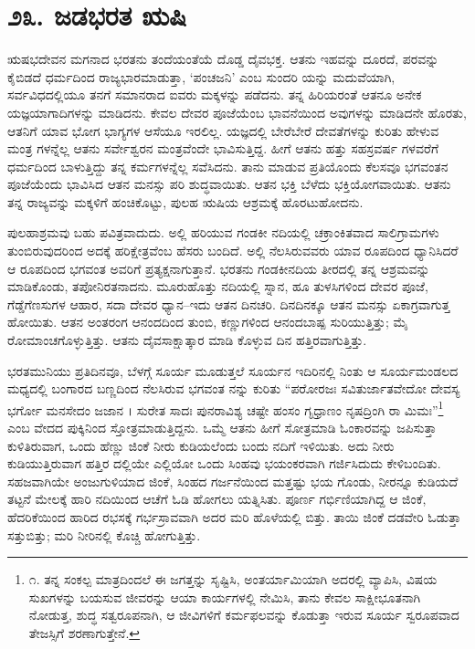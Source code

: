 
\chapter{೨೩. ಜಡಭರತ ಋಷಿ}

ಋಷಭದೇವನ ಮಗನಾದ ಭರತನು ತಂದೆಯಂತೆಯೆ ದೊಡ್ಡ ದೈವಭಕ್ತ. ಆತನು ಇಹವನ್ನು ದೂರದೆ, ಪರವನ್ನು ಕೈಬಿಡದೆ ಧರ್ಮದಿಂದ ರಾಜ್ಯಭಾರಮಾಡುತ್ತಾ, ‘ಪಂಚಜನಿ’ ಎಂಬ ಸುಂದರಿ ಯನ್ನು ಮದುವೆಯಾಗಿ, ಸರ್ವವಿಧದಲ್ಲಿಯೂ ತನಗೆ ಸಮಾನರಾದ ಐವರು ಮಕ್ಕಳನ್ನು ಪಡೆದನು. ತನ್ನ ಹಿರಿಯರಂತೆ ಆತನೂ ಅನೇಕ ಯಜ್ಞಯಾಗಾದಿಗಳನ್ನು ಮಾಡಿದನು. ಕೇವಲ ದೇವರ ಪೂಜೆಯೆಂಬ ಭಾವನೆಯಿಂದ ಅವುಗಳನ್ನು ಮಾಡಿದನೇ ಹೊರತು, ಆತನಿಗೆ ಯಾವ ಭೋಗ ಭಾಗ್ಯಗಳ ಆಸೆಯೂ ಇರಲಿಲ್ಲ. ಯಜ್ಞದಲ್ಲಿ ಬೇರೆಬೇರೆ ದೇವತೆಗಳನ್ನು ಕುರಿತು ಹೇಳುವ ಮಂತ್ರ ಗಳನ್ನೆಲ್ಲ ಆತನು ಸರ್ವೇಶ್ವರನ ಮಂತ್ರವೆಂದೇ ಭಾವಿಸುತ್ತಿದ್ದ. ಹೀಗೆ ಆತನು ಹತ್ತು ಸಹಸ್ರವರ್ಷ ಗಳವರೆಗೆ ಧರ್ಮದಿಂದ ಬಾಳುತ್ತಿದ್ದು ತನ್ನ ಕರ್ಮಗಳನ್ನೆಲ್ಲ ಸವೆಸಿದನು. ತಾನು ಮಾಡುವ ಪ್ರತಿಯೊಂದು ಕೆಲಸವೂ ಭಗವಂತನ ಪೂಜೆಯೆಂದು ಭಾವಿಸಿದ ಆತನ ಮನಸ್ಸು ಪರಿ ಶುದ್ಧವಾಯಿತು. ಆತನ ಭಕ್ತಿ ಬೆಳೆದು ಭಕ್ತಿಯೋಗವಾಯಿತು. ಆತನು ತನ್ನ ರಾಜ್ಯವನ್ನು ಮಕ್ಕಳಿಗೆ ಹಂಚಿಕೊಟ್ಟು, ಪುಲಹ ಋಷಿಯ ಆಶ್ರಮಕ್ಕೆ ಹೊರಟುಹೋದನು.

ಪುಲಹಾಶ್ರಮವು ಬಹು ಪವಿತ್ರವಾದುದು. ಅಲ್ಲಿ ಹರಿಯುವ ಗಂಡಕೀ ನದಿಯಲ್ಲಿ ಚಕ್ರಾಂಕಿತವಾದ ಸಾಲಿಗ್ರಾಮಗಳು ತುಂಬಿರುವುದರಿಂದ ಅದಕ್ಕೆ ಹರಿಕ್ಷೇತ್ರವೆಂಬ ಹೆಸರು ಬಂದಿದೆ. ಅಲ್ಲಿ ನೆಲಸಿರುವವರು ಯಾವ ರೂಪದಿಂದ ಧ್ಯಾನಿಸಿದರೆ ಆ ರೂಪದಿಂದ ಭಗವಂತ ಅವರಿಗೆ ಪ್ರತ್ಯಕ್ಷನಾಗುತ್ತಾನೆ. ಭರತನು ಗಂಡಕೀನದಿಯ ತೀರದಲ್ಲಿ ತನ್ನ ಆಶ್ರಮವನ್ನು ಮಾಡಿಕೊಂಡು, ತಪೋನಿರತನಾದನು. ಮೂರುಹೊತ್ತು ನದಿಯಲ್ಲಿ ಸ್ನಾನ, ಹೂ ತುಳಸಿಗಳಿಂದ ದೇವರ ಪೂಜೆ, ಗೆಡ್ಡೆಗೆಣಸುಗಳ ಆಹಾರ, ಸದಾ ದೇವರ ಧ್ಯಾನ–ಇದು ಆತನ ದಿನಚರಿ. ದಿನದಿನಕ್ಕೂ ಆತನ ಮನಸ್ಸು ಏಕಾಗ್ರವಾಗುತ್ತ ಹೋಯಿತು. ಆತನ ಅಂತರಂಗ ಆನಂದದಿಂದ ತುಂಬಿ, ಕಣ್ಣುಗಳಿಂದ ಆನಂದಬಾಷ್ಪ ಸುರಿಯುತ್ತಿತ್ತು; ಮೈ ರೋಮಾಂಚಗೊಳ್ಳುತ್ತಿತ್ತು. ಆತನು ದೈವಸಾಕ್ಷಾತ್ಕಾರ ಮಾಡಿ ಕೊಳ್ಳುವ ದಿನ ಹತ್ತಿರವಾಗುತ್ತಿತ್ತು.

ಭರತಮುನಿಯು ಪ್ರತಿದಿನವೂ, ಬೆಳಗ್ಗೆ ಸೂರ್ಯ ಮೂಡುತ್ತಲೆ ಸೂರ್ಯನ ಇದಿರಿನಲ್ಲಿ ನಿಂತು ಆ ಸೂರ್ಯಮಂಡಲದ ಮಧ್ಯದಲ್ಲಿ ಬಂಗಾರದ ಬಣ್ಣದಿಂದ ನೆಲಸಿರುವ ಭಗವಂತ ನನ್ನು ಕುರಿತು “ಪರೋರಜಃ ಸವಿತುರ್ಜಾತವೇದೋ ದೇವಸ್ಯ ಭರ್ಗೋ ಮನಸೇದಂ ಜಜಾನ । ಸುರೇತ ಸಾದಃ ಪುನರಾವಿಶ್ಯ ಚಷ್ಟೇ ಹಂಸಂ ಗೃಧ್ರಾಣಂ ನೃಷದ್ರಿಂಗಿ ರಾ ಮಿಮಃ”\footnote{೧. ತನ್ನ ಸಂಕಲ್ಪ ಮಾತ್ರದಿಂದಲೆ ಈ ಜಗತ್ತನ್ನು ಸೃಷ್ಟಿಸಿ, ಅಂತರ್ಯಾಮಿಯಾಗಿ ಅದರಲ್ಲಿ ವ್ಯಾಪಿಸಿ, ವಿಷಯ ಸುಖಗಳನ್ನು ಬಯಸುವ ಜೀವರನ್ನು ಆಯಾ ಕಾರ್ಯಗಳಲ್ಲಿ ನೇಮಿಸಿ, ತಾನು ಕೇವಲ ಸಾಕ್ಷೀಭೂತನಾಗಿ ನೋಡುತ್ತ, ಶುದ್ಧ ಸತ್ವರೂಪನಾಗಿ, ಆ ಜೀವಿಗಳಿಗೆ ಕರ್ಮಫಲವನ್ನು ಕೊಡುತ್ತಾ ಇರುವ ಸೂರ್ಯ ಸ್ವರೂಪವಾದ ತೇಜಸ್ಸಿಗೆ ಶರಣಾಗುತ್ತೇನೆ.} ಎಂಬ ವೇದದ ಪುಕ್ಕಿನಿಂದ ಸ್ತೋತ್ರಮಾಡುತ್ತಿದ್ದನು. ಒಮ್ಮೆ ಆತನು ಹೀಗೆ ಸೋತ್ರಮಾಡಿ ಓಂಕಾರವನ್ನು ಜಪಿಸುತ್ತಾ ಕುಳಿತಿರುವಾಗ, ಒಂದು ಹೆಣ್ಣು ಜಿಂಕೆ ನೀರು ಕುಡಿಯಲೆಂದು ಬಂದು ನದಿಗೆ ಇಳಿಯಿತು. ಅದು ನೀರು ಕುಡಿಯುತ್ತಿರುವಾಗ ಹತ್ತಿರ ದಲ್ಲಿಯೇ ಎಲ್ಲಿಯೋ ಒಂದು ಸಿಂಹವು ಭಯಂಕರವಾಗಿ ಗರ್ಜಿಸಿದುದು ಕೇಳಿಬಂದಿತು. ಸಹಜವಾಗಿಯೇ ಅಂಜುಗುಳಿಯಾದ ಜಿಂಕೆ, ಸಿಂಹದ ಗರ್ಜನೆಯಿಂದ ಮತ್ತಷ್ಟು ಭಯ ಗೊಂಡು, ನೀರನ್ನೂ ಕುಡಿಯದೆ ತಟ್ಟನೆ ಮೇಲಕ್ಕೆ ಹಾರಿ ನದಿಯಿಂದ ಆಚೆಗೆ ಓಡಿ ಹೋಗಲು ಯತ್ನಿಸಿತು. ಪೂರ್ಣ ಗರ್ಭಿಣಿಯಾಗಿದ್ದ ಆ ಜಿಂಕೆ, ಹೆದರಿಕೆಯಿಂದ ಹಾರಿದ ರಭಸಕ್ಕೆ ಗರ್ಭಸ್ರಾವವಾಗಿ ಅದರ ಮರಿ ಹೊಳೆಯಲ್ಲಿ ಬಿತ್ತು. ತಾಯಿ ಜಿಂಕೆ ದಡವೇರಿ ಓಡುತ್ತಾ ಸತ್ತುಬಿತ್ತು; ಮರಿ ನೀರಿನಲ್ಲಿ ಕೊಚ್ಚಿ ಹೋಗುತ್ತಿತ್ತು.

